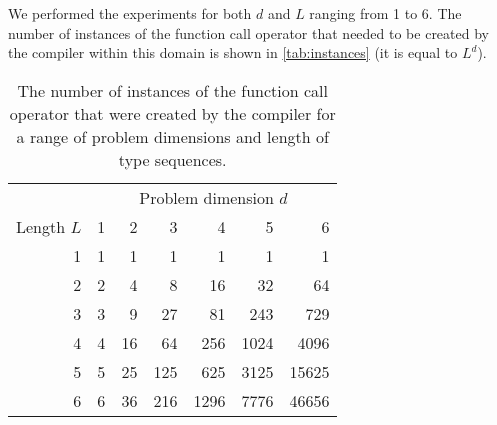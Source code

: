\documentclass[10pt,a4paper]{article}
\theoremstyle{definition}\newtheorem{problem}{Problem}
\providecommand{\symdim}{\ensuremath{d}\xspace}
\begin{document}
We performed the experiments for both \symdim and $L$ ranging from 1 to 6. The number of instances of the function call operator that needed to be created by the compiler within this domain is shown in \autoref{tab:instances} (it is equal to $L^d$).
\renewcommand{\arraystretch}{1.00}
\renewcommand{\tabcolsep}{3mm}
\begin{table}[t]
\caption{The number of instances of the function call operator that were created by the compiler for a range of problem dimensions and length of type sequences.} \begin{center}
\begin{tabular}{r*{6}{r}}
\toprule
 & \multicolumn{6}{c}{Problem dimension $d$} \\ \cmidrule(l){2-7}
Length $L$ & 1 & 2 & 3 & 4 & 5 & 6 \\ \cmidrule(r){1-1} \cmidrule(l){2-7}
1 & 1 & 1 & 1 & 1 & 1 & 1 \\
2 & 2 & 4 & 8 & 16 & 32 & 64 \\
3 & 3 & 9 & 27 & 81 & 243 & 729 \\
4 & 4 & 16 & 64 & 256 & 1024 & 4096 \\
5 & 5 & 25 & 125 & 625 & 3125 & 15625 \\
6 & 6 & 36 & 216 & 1296 & 7776 & 46656 \\
\bottomrule
\end{tabular}
\end{center}
\label{tab:instances}
\end{table}
\end{document}
